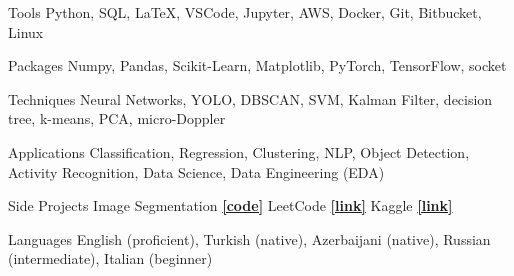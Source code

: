 

\begin{cvskills}

  \cvskill
    {Tools} %
    {Python, SQL, \LaTeX, VSCode, Jupyter, AWS, Docker, Git, Bitbucket, Linux} %

  \cvskill
    {Packages} %
    {Numpy, Pandas, Scikit-Learn, Matplotlib, PyTorch, TensorFlow, socket} %

  \cvskill
    {Techniques} %
    {Neural Networks, YOLO, DBSCAN, SVM, Kalman Filter, decision tree, k-means, PCA, micro-Doppler} %
    
  \cvskill
    {Applications} %
    {Classification, Regression, Clustering, NLP, Object Detection, Activity Recognition, Data Science, Data Engineering (EDA)} %
    

  \cvskill
    {Side Projects} %
    {Image Segmentation \href{https://github.com/enverbashirov/Image-Segmentation-Superpixels}{\textbf{[code]}} LeetCode \href{https://leetcode.com/enverbashirov/}{\textbf{[link]}} Kaggle \href{https://www.kaggle.com/enverbashirov}{\textbf{[link]}}} %

  \hline
  
  \cvskill
    {Languages} %
    {English (proficient), Turkish (native), Azerbaijani (native), Russian (intermediate), Italian (beginner)} %




\end{cvskills}
